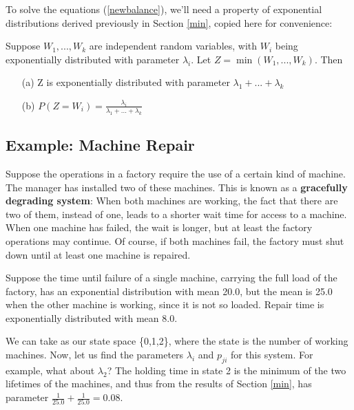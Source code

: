To solve the equations  (\ref{newbalance}), we'll need a property of
exponential distributions derived previously in Section \ref{min},
copied here for convenience:

\begin{theorem}

Suppose $W_{1},...,W_{k}$ are independent random variables, with $W_{i}$
being exponentially distributed with parameter $\lambda_{i}$.  Let
$Z=\min(W_{1},...,W_{k})$. Then

\begin{itemize}

\item [(a)] Z is exponentially distributed with parameter $\lambda
_{1}+...+\lambda_{k}$

\item [(b)] $P(Z=W_{i}) =
\frac{\lambda_{i}}{\lambda_{1}+...+\lambda_{k}}$

\end{itemize}

\end{theorem}

\subsection{Example:  Machine Repair}
\label{machinerepair}

Suppose the operations in a factory require the use of a certain kind of
machine.  The manager has installed two of these machines. This is known
as a \textbf{gracefully degrading system}: When both machines are
working, the fact that there are two of them, instead of one, leads to a
shorter wait time for access to a machine.  When one machine has failed,
the wait is longer, but at least the factory operations may continue. Of
course, if both machines fail, the factory must shut down until at least
one machine is repaired.

Suppose the time until failure of a single machine, carrying the full
load of the factory, has an exponential distribution with mean 20.0, but
the mean is 25.0 when the other machine is working, since it is not so
loaded. Repair time is exponentially distributed with mean 8.0.

We can take as our state space \{0,1,2\}, where the state is the number
of working machines. Now, let us find the parameters $\lambda_{i}$ and
$p_{ji}$ for this system. For example, what about $\lambda_{2}$?
The holding time in state 2 is the minimum of the two lifetimes of the
machines, and thus from the results of Section \ref{min}, has parameter
$\frac{1}{25.0}+\frac{1}{25.0}=0.08$. 

